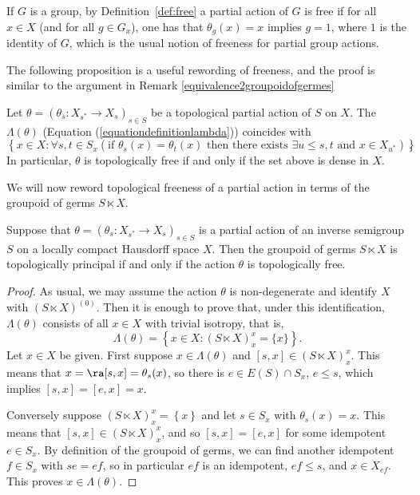 If $G$ is a group, by Definition~\ref{def:free} a partial action of $G$ is free if for all $x\in X$ (and for all $g\in G_x$), one has that $\theta_g(x)=x$ implies $g=1$, where $1$ is the identity of $G$, which is the usual notion of freeness for partial group actions.

The following proposition is a useful rewording of freeness, and the proof is similar to the argument in Remark \ref{equivalence2groupoidofgermes}

\begin{proposition}
Let $\theta=\left(\theta_s:X_{s^*}\to X_s\right)_{s\in S}$ be a topological partial action of $S$ on $X$. The $\Lambda(\theta)$ (Equation (\ref{equationdefinitionlambda})) coincides with
\[\left\{x\in X:\forall s,t\in S_x\left(\text{if }\theta_s(x)=\theta_t(x)\text{ then there exists }\exists u\leq s,t\text{ and }x\in X_{u^*}\right)\right\}.\]
In particular, $\theta$ is topologically free if and only if the set above is dense in $X$.%
\end{proposition}

We will now reword topological freeness of a partial action in terms of the groupoid of germs $S\ltimes X$.

\begin{proposition}\label{prop:principalfree}
Suppose that $\theta=\left(\theta_s:X_{s^*}\to X_s\right)_{s\in S}$ is a partial action of an inverse semigroup $S$ on a locally compact Hausdorff space $X$. Then the groupoid of germs $S\ltimes X$ is topologically principal if and only if the action $\theta$ is topologically free.
\end{proposition}

\begin{proof}
As usual, we may assume the action $\theta$ is non-degenerate and identify $X$ with $(S\ltimes X)^{(0)}$. Then it is enough to prove that, under this identification, $\Lambda(\theta)$ consists of all $x\in X$ with trivial isotropy, that is,
\[\Lambda(\theta)=\left\{x\in X:(S \ltimes X)_x^x=\{x\}\right\}.\]
Let $x\in X$ be given. First suppose $x\in \Lambda(\theta)$ and $[s,x]\in(S\ltimes X)_x^x$. This means that $x=\ra[s,x]=\theta_s(x)$, so there is $e\in E(S)\cap S_x$, $e\leq s$, which implies $[s,x]=[e,x]=x$.

Conversely suppose $(S\ltimes X)_x^x=\left\{x\right\}$ and let $s\in S_x$ with $\theta_s(x)=x$. This means that $[s,x]\in(S\ltimes X)_x^x$, and so $[s,x]=[e,x]$ for some idempotent $e\in S_x$. By definition of the groupoid of germs, we can find another idempotent $f\in S_x$ with $se=ef$, so in particular $ef$ is an idempotent, $ef\leq s$, and $x\in X_{ef}$. This proves $x\in \Lambda(\theta)$.
\end{proof}

